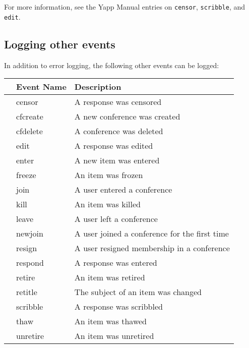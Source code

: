 \documentclass[twoside]{report}
\begin{document}
         For more information, see the Yapp Manual entries  on 
         {\tt censor}, {\tt scribble}, and {\tt edit}.
   
      \subsection{Logging other events}
         In addition to error logging, the following other events can
         be logged:
   
   
         {
         \begin{tabular}{lll}
            & Event Name                     &  Description \\ \hline
            & censor  \index{censor!log}     &  A response was censored\\
            & cfcreate\index{cfcreate!log}   &  A new conference was created \\
            & cfdelete\index{cfdelete!log}   &  A conference was deleted \\
            & edit    \index{edit!log}       &  A response was edited \\
            & enter   \index{enter!log}      &  A new item was entered \\
            & freeze  \index{freeze!log}     &  An item was frozen \\
            & join    \index{join!log}       &  A user entered a conference \\
            & kill    \index{kill!log}       &  An item was killed \\
            & leave   \index{leave!log}      &  A user left a conference \\
            & newjoin \index{newjoin!log}    &  A user joined a conference for the first time \\
            & resign  \index{resign!log}     &  A user resigned membership in a conference \\
      	    & respond \index{respond!log}    &  A response was entered \\
            & retire  \index{retire!log}     &  An item was retired \\
            & retitle \index{retitle!log}    &  The subject of an item was changed \\
            & scribble\index{scribble!log}   &  A response was scribbled \\
            & thaw    \index{thaw!log}       &  An item was thawed \\
            & unretire\index{unretire!log}   &  An item was unretired \\
         \end{tabular}
         }
      \vspace{12pt}
\end{document}
